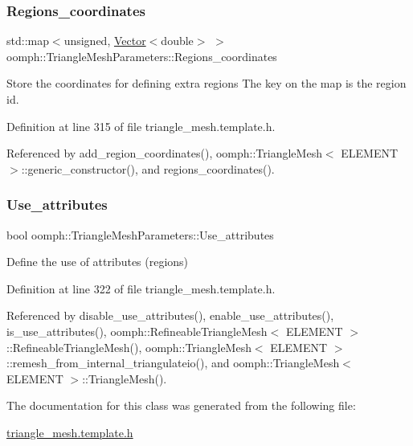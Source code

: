 \subsubsection{\texorpdfstring{Regions\+\_\+coordinates}{Regions\_coordinates}}
{\footnotesize\ttfamily std\+::map$<$unsigned, \hyperlink{classoomph_1_1Vector}{Vector}$<$double$>$ $>$ oomph\+::\+Triangle\+Mesh\+Parameters\+::\+Regions\+\_\+coordinates\hspace{0.3cm}{\ttfamily [protected]}}



Store the coordinates for defining extra regions The key on the map is the region id. 



Definition at line 315 of file triangle\+\_\+mesh.\+template.\+h.



Referenced by add\+\_\+region\+\_\+coordinates(), oomph\+::\+Triangle\+Mesh$<$ E\+L\+E\+M\+E\+N\+T $>$\+::generic\+\_\+constructor(), and regions\+\_\+coordinates().

\mbox{\label{classoomph_1_1TriangleMeshParameters_ace3e9037373f215360c435dc85064db7}} 
\subsubsection{\texorpdfstring{Use\+\_\+attributes}{Use\_attributes}}
{\footnotesize\ttfamily bool oomph\+::\+Triangle\+Mesh\+Parameters\+::\+Use\+\_\+attributes\hspace{0.3cm}{\ttfamily [protected]}}



Define the use of attributes (regions) 



Definition at line 322 of file triangle\+\_\+mesh.\+template.\+h.



Referenced by disable\+\_\+use\+\_\+attributes(), enable\+\_\+use\+\_\+attributes(), is\+\_\+use\+\_\+attributes(), oomph\+::\+Refineable\+Triangle\+Mesh$<$ E\+L\+E\+M\+E\+N\+T $>$\+::\+Refineable\+Triangle\+Mesh(), oomph\+::\+Triangle\+Mesh$<$ E\+L\+E\+M\+E\+N\+T $>$\+::remesh\+\_\+from\+\_\+internal\+\_\+triangulateio(), and oomph\+::\+Triangle\+Mesh$<$ E\+L\+E\+M\+E\+N\+T $>$\+::\+Triangle\+Mesh().



The documentation for this class was generated from the following file\+:\begin{DoxyCompactItemize}
\item 
\hyperlink{triangle__mesh_8template_8h}{triangle\+\_\+mesh.\+template.\+h}\end{DoxyCompactItemize}

